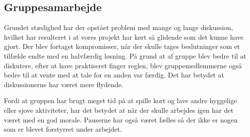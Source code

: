 \subsection{Gruppesamarbejde}
Grundet stædighed har der opstået problem med mange og lange diskussion, hvilket har resulteret i at vores projekt har kørt så glidende som det kunne have gjort. Der blev fortaget kompromisser, når der skulle tages beslutninger som et tilfælde endte med en halvfærdig løsning.
På grund at af gruppe blev bedre til at diskutere, efter at have praktiseret finger reglen, blev gruppemedlemmerne også bedre til at vente med at tale for en anden var færdig. Det har betydet at diskussionerne har været mere flydende.

Fordi at gruppen har brugt meget tid på at spille kort og lave andre hyggelige eller sjove aktiviteter, har det betydet at når der skulle arbejdes igen har det været med en god morale. Pauserne har også været fælles så der ikke er nogen som er blevet forstyrret under arbejdet. 